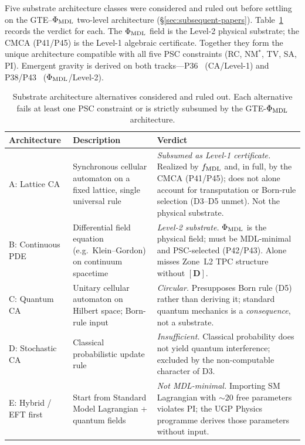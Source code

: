 \documentclass[12pt,letterpaper]{article}
\begin{document}
Five substrate architecture classes were considered and ruled out before settling on
the GTE--$\Phi_{\rm MDL}$ two-level architecture (\S\ref{sec:subsequent-papers}).
Table~\ref{tab:substrate_options} records the verdict for each.
The $\Phi_{\rm MDL}$ field is the Level-2 physical substrate; the CMCA (P41/P45)
is the Level-1 algebraic certificate.  Together they form the unique architecture
compatible with all five PSC constraints (RC, NM$^*$, TV, SA, PI).
Emergent gravity is derived on both tracks---P36~\cite{SpivackEmergentGravity}
(CA/Level-1) and P38/P43~\cite{SpivackPhiMDLGravity,SpivackCompleteness}
($\Phi_{\rm MDL}$/Level-2).

\begin{table}[h!]
\centering
\small
\caption{Substrate architecture alternatives considered and ruled out.
Each alternative fails at least one PSC constraint or is strictly subsumed by
the GTE-$\Phi_{\rm MDL}$ architecture.}
\label{tab:substrate_options}
\begin{tabular}{p{} p{} p{}}
\toprule
\textbf{Architecture} & \textbf{Description} & \textbf{Verdict} \\
\midrule
A: Lattice CA & Synchronous cellular automaton on a fixed lattice, single universal rule & \emph{Subsumed as Level-1 certificate.} Realized by $f_{\rm MDL}$ and, in full, by the CMCA (P41/P45); does not alone account for transputation or Born-rule selection (D3--D5 unmet). Not the physical substrate. \\
B: Continuous PDE & Differential field equation (e.g.\ Klein--Gordon) on continuum spacetime & \emph{Level-2 substrate.} $\Phi_{\rm MDL}$ is the physical field; must be MDL-minimal and PSC-selected (P42/P43). Alone misses Zone~L2 TPC structure without $[\mathbf{D}]$. \\
C: Quantum CA & Unitary cellular automaton on Hilbert space; Born-rule input & \emph{Circular.} Presupposes Born rule (D5) rather than deriving it; standard quantum mechanics is a \emph{consequence}, not a substrate. \\
D: Stochastic CA & Classical probabilistic update rule & \emph{Insufficient.} Classical probability does not yield quantum interference; excluded by the non-computable character of D3. \\
E: Hybrid / EFT first & Start from Standard Model Lagrangian + quantum fields & \emph{Not MDL-minimal.} Importing SM Lagrangian with $\sim 20$ free parameters violates PI; the UGP Physics programme derives those parameters without input. \\
\bottomrule
\end{tabular}
\end{table}
\end{document}
